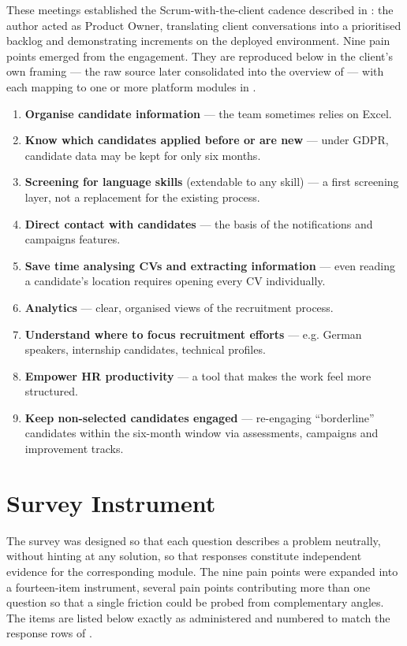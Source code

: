 These meetings established the Scrum-with-the-client cadence described in
: the author acted as Product Owner, translating
client conversations into a prioritised backlog and demonstrating increments
on the deployed environment. Nine pain points emerged from the engagement.
They are reproduced below in the client's own framing --- the raw source
later consolidated into the overview of  ---
with each mapping to one or more platform modules in
.

\begin{enumerate}
	\item \textbf{Organise candidate information} --- the team sometimes relies on Excel.
	\item \textbf{Know which candidates applied before or are new} --- under GDPR, candidate data may be kept for only six months.
	\item \textbf{Screening for language skills} (extendable to any skill) --- a first screening layer, not a replacement for the existing process.
	\item \textbf{Direct contact with candidates} --- the basis of the notifications and campaigns features.
	\item \textbf{Save time analysing CVs and extracting information} --- even reading a candidate's location requires opening every CV individually.
	\item \textbf{Analytics} --- clear, organised views of the recruitment process.
	\item \textbf{Understand where to focus recruitment efforts} --- e.g. German speakers, internship candidates, technical profiles.
	\item \textbf{Empower HR productivity} --- a tool that makes the work feel more structured.
	\item \textbf{Keep non-selected candidates engaged} --- re-engaging ``borderline'' candidates within the six-month window via assessments, campaigns and improvement tracks.
\end{enumerate}

\section{Survey Instrument}
\label{app:survey-instrument}

The survey was designed so that each question describes a problem neutrally,
without hinting at any solution, so that responses constitute independent
evidence for the corresponding module. The nine pain points were expanded
into a fourteen-item instrument, several pain points contributing more than
one question so that a single friction could be probed from complementary
angles. The items are listed below exactly as administered and numbered to
match the response rows of .

